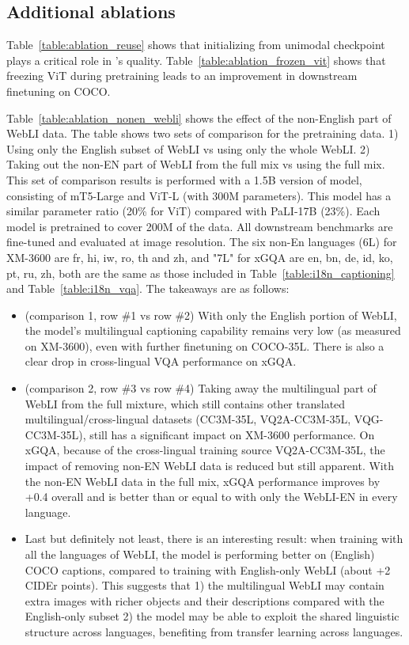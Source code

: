 \subsection{Additional ablations}

Table~\ref{table:ablation_reuse} shows that initializing from unimodal checkpoint plays a critical role in \NAME's quality. 
Table~\ref{table:ablation_frozen_vit} shows that freezing ViT during pretraining leads to an improvement in downstream finetuning on COCO. 

Table~\ref{table:ablation_nonen_webli} shows the effect of the non-English part of WebLI data. The table shows two sets of comparison for the pretraining data. 1) Using only the English subset of WebLI vs using only the whole WebLI. 2) Taking out the non-EN part of WebLI from the full mix vs using the full mix. This set of comparison results is performed with a 1.5B version of \NAME model, consisting of mT5-Large and ViT-L (with 300M parameters). This model has a similar parameter ratio (20\% for ViT) compared with PaLI-17B (23\%). Each model is pretrained to cover 200M of the data. All downstream benchmarks are fine-tuned and evaluated at  image resolution. The six non-En languages (6L) for XM-3600 are fr, hi, iw, ro, th and zh, and "7L" for xGQA are en, bn, de, id, ko, pt, ru, zh, both are the same as those included in Table~\ref{table:i18n_captioning} and Table~\ref{table:i18n_vqa}. The takeaways are as follows:
\begin{itemize}
    \item (comparison 1, row \#1 vs row \#2) With only the English portion of WebLI, the model's multilingual captioning capability remains very low (as measured on XM-3600), even with further finetuning on COCO-35L. There is also a clear drop in cross-lingual VQA performance on xGQA.
    \item (comparison 2, row \#3 vs row \#4) Taking away the multilingual part of WebLI from the full mixture, which still contains other translated multilingual/cross-lingual datasets (CC3M-35L, VQ2A-CC3M-35L, VQG-CC3M-35L), still has a significant impact on XM-3600 performance. On xGQA, because of the cross-lingual training source VQ2A-CC3M-35L, the impact of removing non-EN WebLI data is reduced but still apparent. With the non-EN WebLI data in the full mix, xGQA performance improves by +0.4 overall and is better than or equal to with only the WebLI-EN in every language. 
    \item Last but definitely not least, there is an interesting result: when training with all the languages of WebLI, the model is performing better on (English) COCO captions, compared to training with English-only WebLI (about +2 CIDEr points). This suggests that 1) the multilingual WebLI may contain extra images with richer objects and their descriptions compared with the English-only subset 2) the model may be able to exploit the shared linguistic structure across languages, benefiting from transfer learning across languages.
\end{itemize}

